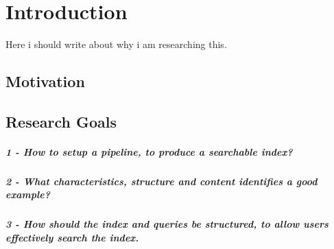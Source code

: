 
\chapter{Introduction}

Here i should write about why i am researching this.

\section{Motivation}

\section{Research Goals}

\paragraph{1 - How to setup a pipeline, to produce a searchable index?}

\paragraph{2 - What characteristics, structure and content identifies a good example?}

\paragraph{3 - How should the index and queries be structured, to allow users effectively search the index.}




\cleardoublepage